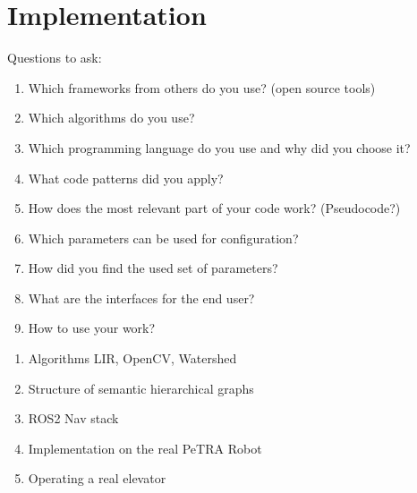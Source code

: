 \chapter{Implementation}
\label{sec:implementation}
Questions to ask:
\begin{enumerate}
    \item Which frameworks from others do you use? (open source tools)
    \item Which algorithms do you use?
    \item Which programming language do you use and why did you choose it?
    \item What code patterns did you apply?
    \item How does the most relevant part of your code work? (Pseudocode?)
    \item Which parameters can be used for configuration?
    \item How did you find the used set of parameters?   
    \item What are the interfaces for the end user?
    \item How to use your work?
\end{enumerate}

\begin{enumerate}
    \item Algorithms LIR, OpenCV, Watershed
    \item Structure of semantic hierarchical graphs
    \item ROS2 Nav stack
    \item Implementation on the real PeTRA Robot
    \item Operating a real elevator 
\end{enumerate}
